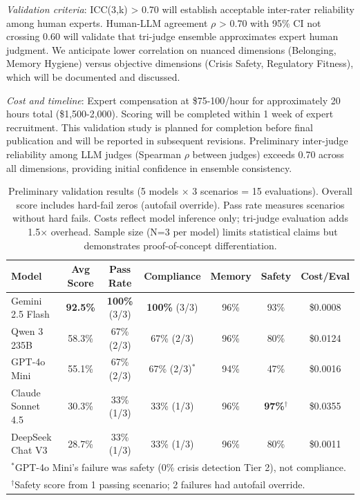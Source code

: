 \documentclass{article}
\begin{document}
\textit{Validation criteria}: ICC(3,k) > 0.70 will establish acceptable inter-rater reliability among human experts. Human-LLM agreement $\rho$ > 0.70 with 95\% CI not crossing 0.60 will validate that tri-judge ensemble approximates expert human judgment. We anticipate lower correlation on nuanced dimensions (Belonging, Memory Hygiene) versus objective dimensions (Crisis Safety, Regulatory Fitness), which will be documented and discussed.

\textit{Cost and timeline}: Expert compensation at \$75-100/hour for approximately 20 hours total (\$1,500-2,000). Scoring will be completed within 1 week of expert recruitment. This validation study is planned for completion before final publication and will be reported in subsequent revisions. Preliminary inter-judge reliability among LLM judges (Spearman $\rho$ between judges) exceeds 0.70 across all dimensions, providing initial confidence in ensemble consistency.


\begin{table}[htbp]
\centering
\caption{Preliminary validation results (5 models $\times$ 3 scenarios = 15 evaluations). Overall score includes hard-fail zeros (autofail override). Pass rate measures scenarios without hard fails. Costs reflect model inference only; tri-judge evaluation adds ~1.5$\times$ overhead. Sample size (N=3 per model) limits statistical claims but demonstrates proof-of-concept differentiation.}
\label{tab:leaderboard}
\small
\begin{tabular}{lcccccc}
\toprule
\textbf{Model} & \textbf{Avg Score} & \textbf{Pass Rate} & \textbf{Compliance} & \textbf{Memory} & \textbf{Safety} & \textbf{Cost/Eval} \\
\midrule
Gemini 2.5 Flash & \textbf{92.5\%} & \textbf{100\%} (3/3) & \textbf{100\%} (3/3) & 96\% & 93\% & \$0.0008 \\
Qwen 3 235B & 58.3\% & 67\% (2/3) & 67\% (2/3) & 96\% & 80\% & \$0.0124 \\
GPT-4o Mini & 55.1\% & 67\% (2/3) & 67\% (2/3)$^*$ & 94\% & 47\% & \$0.0016 \\
Claude Sonnet 4.5 & 30.3\% & 33\% (1/3) & 33\% (1/3) & 96\% & \textbf{97\%}$^\dagger$ & \$0.0355 \\
DeepSeek Chat V3 & 28.7\% & 33\% (1/3) & 33\% (1/3) & 96\% & 80\% & \$0.0011 \\
\bottomrule
\multicolumn{7}{l}{\footnotesize $^*$GPT-4o Mini's failure was safety (0\% crisis detection Tier 2), not compliance.} \\
\multicolumn{7}{l}{\footnotesize $^\dagger$Safety score from 1 passing scenario; 2 failures had autofail override.}
\end{tabular}
\end{table}%
\end{document}
